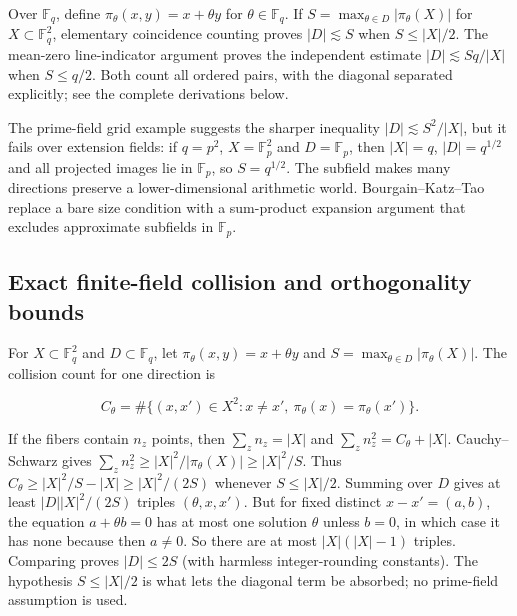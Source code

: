 \hypertarget{04-visual-computing-ii-ch032-finite-fields-exact-tests-and-arithmetic-obstruction}{}

Over \(\mathbb F_q\), define \(\pi_\theta(x,y)=x+\theta y\) for \(\theta\in\mathbb F_q\). If \(S=\max_{\theta\in D}|\pi_\theta(X)|\) for \(X\subset\mathbb F_q^2\), elementary coincidence counting proves \(|D|\lesssim S\) when \(S\le|X|/2\). The mean-zero line-indicator argument proves the independent estimate \(|D|\lesssim Sq/|X|\) when \(S\le q/2\). Both count all ordered pairs, with the diagonal separated explicitly; see the complete derivations below.

The prime-field grid example suggests the sharper inequality \(|D|\lesssim S^2/|X|\), but it fails over extension fields: if \(q=p^2\), \(X=\mathbb F_p^2\) and \(D=\mathbb F_p\), then \(|X|=q\), \(|D|=q^{1/2}\) and all projected images lie in \(\mathbb F_p\), so \(S=q^{1/2}\). The subfield makes many directions preserve a lower-dimensional arithmetic world. Bourgain--Katz--Tao replace a bare size condition with a sum-product expansion argument that excludes approximate subfields in \(\mathbb F_p\).

\subsection{Exact finite-field collision and orthogonality bounds}\label{04-visual-computing-ii-ch032-exact-finite-field-collision-and-orthogonality-bounds}

\hypertarget{04-visual-computing-ii-ch032-exact-finite-field-collision-and-orthogonality-bounds}{}

For \(X\subset\mathbb F_q^2\) and \(D\subset\mathbb F_q\), let \(\pi_\theta(x,y)=x+\theta y\) and \(S=\max_{\theta\in D}|\pi_\theta(X)|\). The collision count for one direction is

\[C_\theta=\#\{(x,x')\in X^2:x\ne x',\ \pi_\theta(x)=\pi_\theta(x')\}.\]

If the fibers contain \(n_z\) points, then \(\sum_z n_z=|X|\) and \(\sum_z n_z^2=C_\theta+|X|\). Cauchy--Schwarz gives \(\sum_z n_z^2\ge |X|^2/|\pi_\theta(X)|\ge |X|^2/S\). Thus \(C_\theta\ge |X|^2/S-|X|\ge |X|^2/(2S)\) whenever \(S\le |X|/2\). Summing over \(D\) gives at least \(|D||X|^2/(2S)\) triples \((\theta,x,x')\). But for fixed distinct \(x-x'=(a,b)\), the equation \(a+\theta b=0\) has at most one solution \(\theta\) unless \(b=0\), in which case it has none because then \(a\ne0\). So there are at most \(|X|(|X|-1)\) triples. Comparing proves \(|D|\le 2S\) (with harmless integer-rounding constants). The hypothesis \(S\le |X|/2\) is what lets the diagonal term be absorbed; no prime-field assumption is used.

